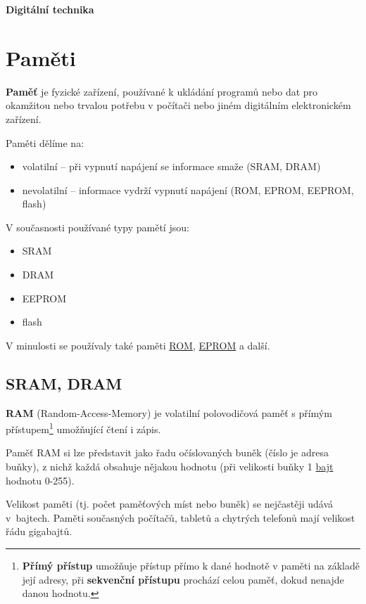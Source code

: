 \documentclass[12pt]{article}
\begin{document}
\begin{center}
	\Huge \textbf{Digitální technika} 
\end{center}



\section{Paměti}

\textbf{Paměť} je fyzické zařízení, používané k ukládání programů nebo dat pro okamžitou nebo trvalou potřebu v počítači nebo jiném digitálním elektronickém zařízení.

Paměti dělíme na: 

\begin{itemize}
	\item volatilní -- při vypnutí napájení se informace smaže (SRAM, DRAM)
	\item nevolatilní -- informace vydrží vypnutí napájení (ROM, EPROM,  EEPROM, flash)
\end{itemize}

V současnosti používané typy pamětí jsou: 

\begin{itemize}
	\item SRAM
	\item DRAM
	\item EEPROM
	\item flash
\end{itemize}

V minulosti se používaly také paměti 
\href{https://cs.wikipedia.org/wiki/ROM}{ROM}, 
\href{https://cs.wikipedia.org/wiki/EPROM}{EPROM}  a další.  

\subsection{SRAM, DRAM}

\textbf{RAM }(Random-Access-Memory) je volatilní polovodičová paměť s přímým 
přístupem\footnote{\textbf{Přímý přístup} umožňuje přístup přímo k dané hodnotě v paměti na základě její adresy, při \textbf{sekvenční přístupu} prochází celou paměť, dokud nenajde danou hodnotu.  }
umožňující čtení i zápis. 

Paměť RAM si lze představit jako řadu očíslovaných  buněk (číslo je adresa buňky), z nichž každá obsahuje nějakou hodnotu (při velikosti buňky 1 \href{https://cs.wikipedia.org/wiki/Bajt}{bajt} hodnotu 0-255).

Velikost paměti (tj. počet paměťových míst nebo buněk) se nejčastěji udává v~bajtech. Paměti současných počítačů, tabletů a chytrých telefonů mají velikost řádu gigabajtů.
\end{document}
